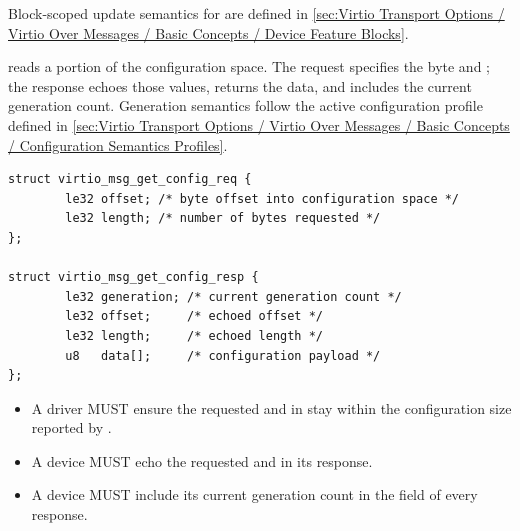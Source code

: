 Block-scoped update semantics for  are defined in
\ref{sec:Virtio Transport Options / Virtio Over Messages / Basic Concepts / Device Feature Blocks}.


 reads a portion of the configuration space. The request
specifies the byte  and ; the response echoes those
values, returns the data, and includes the current generation count. Generation
semantics follow the active configuration profile defined in
\ref{sec:Virtio Transport Options / Virtio Over Messages / Basic Concepts / Configuration Semantics Profiles}.

\begin{lstlisting}
struct virtio_msg_get_config_req {
        le32 offset; /* byte offset into configuration space */
        le32 length; /* number of bytes requested */
};

struct virtio_msg_get_config_resp {
        le32 generation; /* current generation count */
        le32 offset;     /* echoed offset */
        le32 length;     /* echoed length */
        u8   data[];     /* configuration payload */
};
\end{lstlisting}

\begin{itemize}
  \item A driver MUST ensure the requested  and 
        in  stay within the configuration size reported by
        .
\end{itemize}

\begin{itemize}
  \item A device MUST echo the requested  and 
        in its response.
  \item A device MUST include its current generation count in the
         field of every  response.
\end{itemize}

